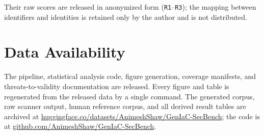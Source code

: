 \documentclass[conference]{IEEEtran}
\begin{document}
\noindent Their raw scores are released in anonymized form (\texttt{R1}--\texttt{R3});
the mapping between identifiers and identities is retained only by the author and
is not distributed.

\section*{Data Availability}
The pipeline, statistical analysis code, figure generation, coverage manifests,
and threats-to-validity documentation are released. Every figure and table is
regenerated from the released data by a single command. The generated corpus,
raw scanner output, human reference corpus, and all derived result tables are
archived at
\href{https://huggingface.co/datasets/AnimeshShaw/GenIaC-SecBench}{huggingface.co/datasets/AnimeshShaw/GenIaC-SecBench};
the code is at
\href{https://github.com/AnimeshShaw/GenIaC-SecBench}{github.com/AnimeshShaw/GenIaC-SecBench}.



\end{document}
